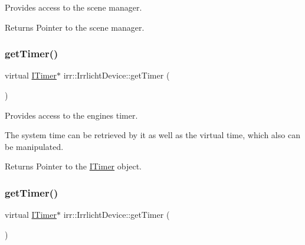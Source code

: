 Provides access to the scene manager. 

\begin{DoxyReturn}{Returns}
Pointer to the scene manager. 
\end{DoxyReturn}
\mbox{\label{classirr_1_1IrrlichtDevice_a96c30fb7f644e1d1dabff563bde26460}} 
\subsubsection{\texorpdfstring{get\+Timer()}{getTimer()}\hspace{0.1cm}{\footnotesize\ttfamily [1/3]}}
{\footnotesize\ttfamily virtual \hyperlink{classirr_1_1ITimer}{I\+Timer}$\ast$ irr\+::\+Irrlicht\+Device\+::get\+Timer (\begin{DoxyParamCaption}{ }\end{DoxyParamCaption})\hspace{0.3cm}{\ttfamily [pure virtual]}}



Provides access to the engine\textquotesingle{}s timer. 

The system time can be retrieved by it as well as the virtual time, which also can be manipulated. \begin{DoxyReturn}{Returns}
Pointer to the \hyperlink{classirr_1_1ITimer}{I\+Timer} object. 
\end{DoxyReturn}
\mbox{\label{classirr_1_1IrrlichtDevice_a96c30fb7f644e1d1dabff563bde26460}} 
\subsubsection{\texorpdfstring{get\+Timer()}{getTimer()}\hspace{0.1cm}{\footnotesize\ttfamily [2/3]}}
{\footnotesize\ttfamily virtual \hyperlink{classirr_1_1ITimer}{I\+Timer}$\ast$ irr\+::\+Irrlicht\+Device\+::get\+Timer (\begin{DoxyParamCaption}{ }\end{DoxyParamCaption})\hspace{0.3cm}{\ttfamily [pure virtual]}}



